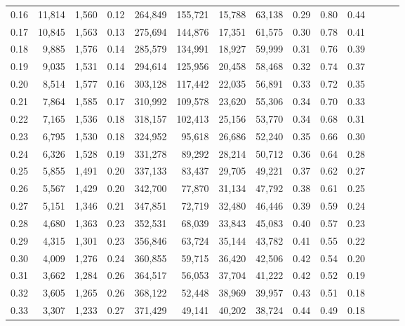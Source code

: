 \begin{tabular}{rrrrrrrrrrrrrr}
0.16 &  11,814 &  1,560 &  0.12 &  264,849 &  155,721 &  15,788 &  63,138 &  0.29 &  0.80 &      0.44 \\
0.17 &  10,845 &  1,563 &  0.13 &  275,694 &  144,876 &  17,351 &  61,575 &  0.30 &  0.78 &      0.41 \\
0.18 &   9,885 &  1,576 &  0.14 &  285,579 &  134,991 &  18,927 &  59,999 &  0.31 &  0.76 &      0.39 \\
0.19 &   9,035 &  1,531 &  0.14 &  294,614 &  125,956 &  20,458 &  58,468 &  0.32 &  0.74 &      0.37 \\
0.20 &   8,514 &  1,577 &  0.16 &  303,128 &  117,442 &  22,035 &  56,891 &  0.33 &  0.72 &      0.35 \\
0.21 &   7,864 &  1,585 &  0.17 &  310,992 &  109,578 &  23,620 &  55,306 &  0.34 &  0.70 &      0.33 \\
0.22 &   7,165 &  1,536 &  0.18 &  318,157 &  102,413 &  25,156 &  53,770 &  0.34 &  0.68 &      0.31 \\
0.23 &   6,795 &  1,530 &  0.18 &  324,952 &   95,618 &  26,686 &  52,240 &  0.35 &  0.66 &      0.30 \\
0.24 &   6,326 &  1,528 &  0.19 &  331,278 &   89,292 &  28,214 &  50,712 &  0.36 &  0.64 &      0.28 \\
0.25 &   5,855 &  1,491 &  0.20 &  337,133 &   83,437 &  29,705 &  49,221 &  0.37 &  0.62 &      0.27 \\
0.26 &   5,567 &  1,429 &  0.20 &  342,700 &   77,870 &  31,134 &  47,792 &  0.38 &  0.61 &      0.25 \\
0.27 &   5,151 &  1,346 &  0.21 &  347,851 &   72,719 &  32,480 &  46,446 &  0.39 &  0.59 &      0.24 \\
0.28 &   4,680 &  1,363 &  0.23 &  352,531 &   68,039 &  33,843 &  45,083 &  0.40 &  0.57 &      0.23 \\
0.29 &   4,315 &  1,301 &  0.23 &  356,846 &   63,724 &  35,144 &  43,782 &  0.41 &  0.55 &      0.22 \\
0.30 &   4,009 &  1,276 &  0.24 &  360,855 &   59,715 &  36,420 &  42,506 &  0.42 &  0.54 &      0.20 \\
0.31 &   3,662 &  1,284 &  0.26 &  364,517 &   56,053 &  37,704 &  41,222 &  0.42 &  0.52 &      0.19 \\
0.32 &   3,605 &  1,265 &  0.26 &  368,122 &   52,448 &  38,969 &  39,957 &  0.43 &  0.51 &      0.18 \\
0.33 &   3,307 &  1,233 &  0.27 &  371,429 &   49,141 &  40,202 &  38,724 &  0.44 &  0.49 &      0.18 \\

\end{tabular}
